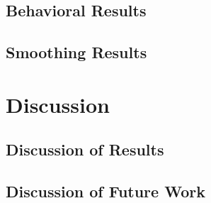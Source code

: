 \documentclass[11pt]{article}
\begin{document}
    \subsection{Behavioral Results}
                
    \subsection{Smoothing Results}
                

\section{Discussion}

    \subsection{Discussion of Results}
            
    \subsection{Discussion of Future Work}
            


\end{document}

